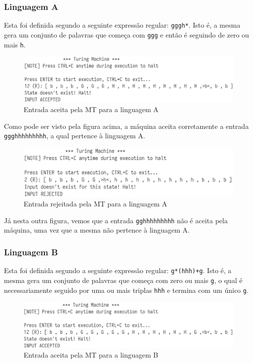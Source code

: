 \documentclass[12pt,fleqn]{article}
\begin{document}
\subsubsection{Linguagem A}
Esta foi definida segundo a seguinte expressão regular: \verb|gggh*|.
Isto é, a mesma gera um conjunto de palavras que começa com \verb|ggg| e então é
seguindo de zero ou mais \verb|h|.

\begin{figure}[H]
    \centering
    \includegraphics[width=0.8\linewidth]{img/tm_language_a_accepted}
    \caption{Entrada aceita pela MT para a linguagem A}
\end{figure}

Como pode ser visto pela figura acima, a máquina aceita corretamente a entrada
\verb|ggghhhhhhhhh|, a qual pertence à linguagem A.

\begin{figure}[H]
    \centering
    \includegraphics[width=0.8\linewidth]{img/tm_language_a_rejected}
    \caption{Entrada rejeitada pela MT para a linguagem A}
\end{figure}

Já nesta outra figura, vemos que a entrada \verb|gghhhhhhhhh| não é aceita pela
máquina, uma vez que a mesma não pertence à linguagem A.

\subsubsection{Linguagem B}
Esta foi definida segundo a seguinte expressão regular:
\verb|g*(hhh)+g|. Isto é, a mesma gera um conjunto de palavras que começa com
zero ou mais \verb|g|, o qual é necessariamente seguido por uma ou mais triplas
\verb|hhh| e termina com um único \verb|g|.

\begin{figure}[H]
    \centering
    \includegraphics[width=0.8\linewidth]{img/tm_language_b_accepted}
    \caption{Entrada aceita pela MT para a linguagem B}
\end{figure}
\end{document}
